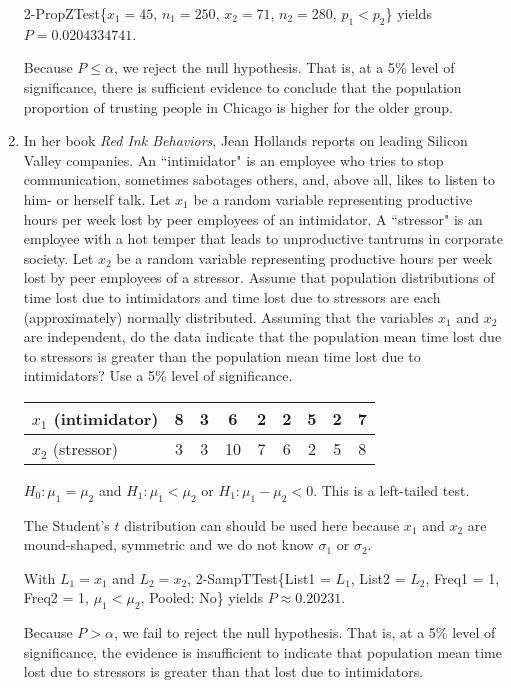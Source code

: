 \begin{enumerate}
{ 2-PropZTest\{$x_1 = 45$, $n_1 = 250$, $x_2 = 71$, $n_2 = 280$, $p_1 < p_2$\}  yields $P = 0.0204334741$.  

Because $P \leq \alpha$, we reject the null hypothesis. That is, at a 5\% level of significance, there is sufficient evidence to conclude that the population proportion of trusting people in Chicago is higher for the older group.  
} 
 
\vfill

\newpage

\item In her book {\em Red Ink Behaviors}, Jean Hollands reports on leading Silicon Valley companies. An ``intimidator" is an employee who tries to stop communication, sometimes sabotages others, and, above all, likes to listen to him- or herself talk. Let $x_1$ be a random variable representing productive hours per week lost by peer employees of an intimidator. A ``stressor" is an employee with a hot temper that leads to unproductive tantrums in corporate society.  Let $x_2$ be a random variable representing productive hours per week lost by peer employees of a stressor. Assume that population distributions of time lost due to intimidators and time lost due to stressors are each (approximately) normally distributed. 
Assuming that the variables $x_1$ and $x_2$ are independent, do the data indicate that the population mean time lost due to stressors is greater than the population mean time lost due to intimidators?  Use a 5\% level of significance.
\begin{center} 
\begin{tabular}{l|cccccccc}
$x_1$  (intimidator)    & 8 & 3 & 6  & 2 & 2 & 5 & 2 & 7 \\
\hline
$x_2$  (stressor)       & 3 & 3 & 10 & 7 & 6 & 2 & 5 & 8 
\end{tabular}
\end{center}


{\answer
 $H_0: \mu_1 = \mu_2$ and $H_1: \mu_1 < \mu_2$ or  $H_1: \mu_1 - \mu_2 < 0$. This is a left-tailed test.   
	
The Student's $t$ distribution can should be used here because $x_1$ and $x_2$ are mound-shaped, symmetric and we do not know $\sigma_1$ or $\sigma_2$.  

With $L_1 = x_1$ and $L_2 = x_2$,  2-SampTTest\{List1 = $L_1$, List2 = $L_2$, Freq1 = 1, Freq2 = 1, $\mu_1 < \mu_2$, Pooled: No\} yields $P \approx 0.20231$.  
	
Because $P > \alpha$, we fail to reject the null hypothesis.  That is, at a 5\% level of significance, the evidence is insufficient to indicate that population mean time lost due to stressors is greater than that lost due to intimidators.  
} 
 


\end{enumerate}
